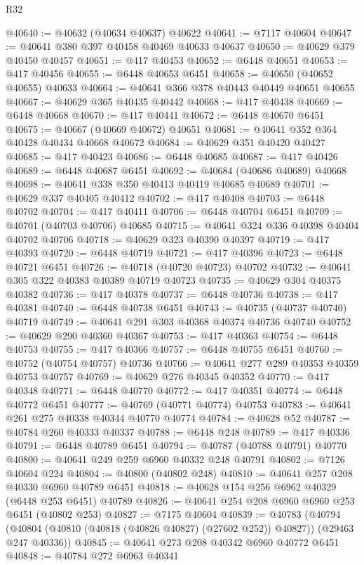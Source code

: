 \begin{lexlean}{R32}
\begin{coremodule}
@40640 := @40632 (@40634 @40637) @40622
@40641 := @7117 @40604
@40647 := @40641 @380 @397 @40458 @40469 @40633 @40637
@40650 := @40629 @379 @40450 @40457
@40651 := @417 @40453
@40652 := @6448 @40651
@40653 := @417 @40456
@40655 := @6448 @40653 @6451
@40658 := @40650 (@40652 @40655) @40633
@40664 := @40641 @366 @378 @40443 @40449 @40651 @40655
@40667 := @40629 @365 @40435 @40442
@40668 := @417 @40438
@40669 := @6448 @40668
@40670 := @417 @40441
@40672 := @6448 @40670 @6451
@40675 := @40667 (@40669 @40672) @40651
@40681 := @40641 @352 @364 @40428 @40434 @40668 @40672
@40684 := @40629 @351 @40420 @40427
@40685 := @417 @40423
@40686 := @6448 @40685
@40687 := @417 @40426
@40689 := @6448 @40687 @6451
@40692 := @40684 (@40686 @40689) @40668
@40698 := @40641 @338 @350 @40413 @40419 @40685 @40689
@40701 := @40629 @337 @40405 @40412
@40702 := @417 @40408
@40703 := @6448 @40702
@40704 := @417 @40411
@40706 := @6448 @40704 @6451
@40709 := @40701 (@40703 @40706) @40685
@40715 := @40641 @324 @336 @40398 @40404 @40702 @40706
@40718 := @40629 @323 @40390 @40397
@40719 := @417 @40393
@40720 := @6448 @40719
@40721 := @417 @40396
@40723 := @6448 @40721 @6451
@40726 := @40718 (@40720 @40723) @40702
@40732 := @40641 @305 @322 @40383 @40389 @40719 @40723
@40735 := @40629 @304 @40375 @40382
@40736 := @417 @40378
@40737 := @6448 @40736
@40738 := @417 @40381
@40740 := @6448 @40738 @6451
@40743 := @40735 (@40737 @40740) @40719
@40749 := @40641 @291 @303 @40368 @40374 @40736 @40740
@40752 := @40629 @290 @40360 @40367
@40753 := @417 @40363
@40754 := @6448 @40753
@40755 := @417 @40366
@40757 := @6448 @40755 @6451
@40760 := @40752 (@40754 @40757) @40736
@40766 := @40641 @277 @289 @40353 @40359 @40753 @40757
@40769 := @40629 @276 @40345 @40352
@40770 := @417 @40348
@40771 := @6448 @40770
@40772 := @417 @40351
@40774 := @6448 @40772 @6451
@40777 := @40769 (@40771 @40774) @40753
@40783 := @40641 @261 @275 @40338 @40344 @40770 @40774
@40784 := @40628 @52
@40787 := @40784 @260 @40333 @40337
@40788 := @6448 @248
@40789 := @417 @40336
@40791 := @6448 @40789 @6451
@40794 := @40787 (@40788 @40791) @40770
@40800 := @40641 @249 @259 @6960 @40332 @248 @40791
@40802 := @7126 @40604 @224
@40804 := @40800 (@40802 @248)
@40810 := @40641 @257 @208 @40330 @6960 @40789 @6451
@40818 := @40628 @154 @256 @6962 @40329 (@6448 @253 @6451) @40789
@40826 := @40641 @254 @208 @6960 @6960 @253 @6451 (@40802 @253)
@40827 := @7175 @40604
@40839 := @40783
    (@40794 (@40804 (@40810 (@40818 (@40826 @40827) (@27602 @252)) @40827)) (@29463 @247 @40336))
@40845 := @40641 @273 @208 @40342 @6960 @40772 @6451
@40848 := @40784 @272 @6963 @40341

\end{coremodule}
\end{lexlean}
